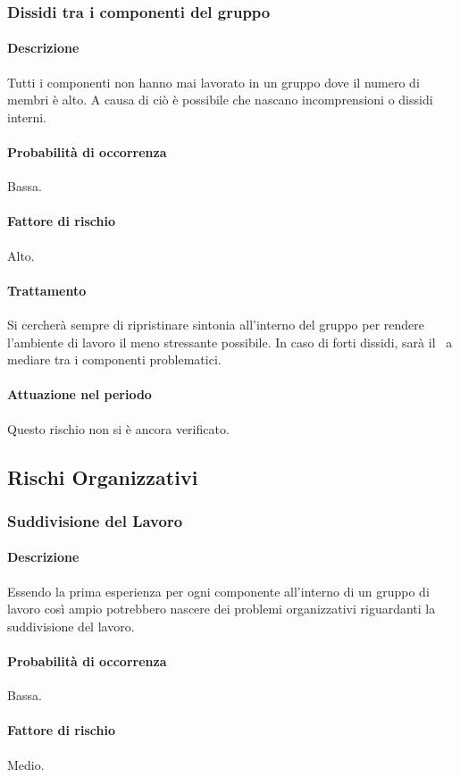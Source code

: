 \subsubsection{Dissidi tra i componenti del gruppo}
\paragraph{Descrizione}
Tutti i componenti non hanno mai lavorato in un gruppo dove il numero di membri è alto. A causa di ciò è possibile che nascano incomprensioni o dissidi interni.
\paragraph{Probabilità di occorrenza}
Bassa.
\paragraph{Fattore di rischio}
Alto.
\paragraph{Trattamento}
Si cercherà sempre di ripristinare sintonia all'interno del gruppo per rendere l'ambiente di lavoro il meno stressante possibile. In caso di forti dissidi, sarà il \Pm\ a mediare tra i componenti problematici.
\paragraph{Attuazione nel periodo}
Questo rischio non si è ancora verificato.

\subsection{Rischi Organizzativi}
\subsubsection{Suddivisione del Lavoro}
\paragraph{Descrizione}
Essendo la prima esperienza per ogni componente all'interno di un gruppo di lavoro così ampio potrebbero nascere dei problemi organizzativi riguardanti la suddivisione del lavoro.
\paragraph{Probabilità di occorrenza}
Bassa.
\paragraph{Fattore di rischio}
Medio.
